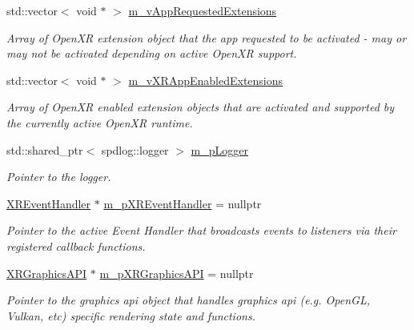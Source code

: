 \begin{DoxyCompactItemize}
std\+::vector$<$ void $\ast$ $>$ \mbox{\hyperlink{class_open_x_r_provider_1_1_x_r_provider_a2e75834c9b96a31c762f95abe9e624dc}{m\+\_\+v\+App\+Requested\+Extensions}}
\begin{DoxyCompactList}\small\item\em Array of Open\+XR extension object that the app requested to be activated -\/ may or may not be activated depending on active Open\+XR support. \end{DoxyCompactList}\item 
std\+::vector$<$ void $\ast$ $>$ \mbox{\hyperlink{class_open_x_r_provider_1_1_x_r_provider_a4d4e90698cf0bd5c71433f5fee3133ed}{m\+\_\+v\+X\+R\+App\+Enabled\+Extensions}}
\begin{DoxyCompactList}\small\item\em Array of Open\+XR enabled extension objects that are activated and supported by the currently active Open\+XR runtime. \end{DoxyCompactList}\item 
std\+::shared\+\_\+ptr$<$ spdlog\+::logger $>$ \mbox{\hyperlink{class_open_x_r_provider_1_1_x_r_provider_aa03872a4d32010786389d57f1c9dad6e}{m\+\_\+p\+Logger}}
\begin{DoxyCompactList}\small\item\em Pointer to the logger. \end{DoxyCompactList}\item 
\mbox{\hyperlink{class_open_x_r_provider_1_1_x_r_event_handler}{X\+R\+Event\+Handler}} $\ast$ \mbox{\hyperlink{class_open_x_r_provider_1_1_x_r_provider_a567e5a128da44ded57c3a666704a9c17}{m\+\_\+p\+X\+R\+Event\+Handler}} = nullptr
\begin{DoxyCompactList}\small\item\em Pointer to the active Event Handler that broadcasts events to listeners via their registered callback functions. \end{DoxyCompactList}\item 
\mbox{\hyperlink{class_open_x_r_provider_1_1_x_r_graphics_a_p_i}{X\+R\+Graphics\+A\+PI}} $\ast$ \mbox{\hyperlink{class_open_x_r_provider_1_1_x_r_provider_a981c5add10cfe23149e821b470145957}{m\+\_\+p\+X\+R\+Graphics\+A\+PI}} = nullptr
\begin{DoxyCompactList}\small\item\em Pointer to the graphics api object that handles graphics api (e.\+g. Open\+GL, Vulkan, etc) specific rendering state and functions. \end{DoxyCompactList}\item 

\end{DoxyCompactItemize}
